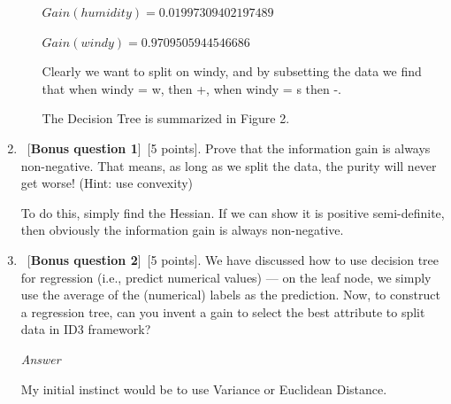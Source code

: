 \documentclass[12pt, fullpage,letterpaper]{article}
\begin{document}
\begin{enumerate}
\begin{enumerate}
$Gain(humidity)=0.01997309402197489$

$Gain(windy)=0.9709505944546686$

Clearly we want to split on windy, and by subsetting the data we find that when windy = w, then +, when windy = s then -.

The Decision Tree is summarized in Figure 2.

\end{enumerate}
\item ~[\textbf{Bonus question 1}]~[5 points].  Prove that the information gain is always non-negative.  That means, as long as we split the data, the purity will never get worse! (Hint: use convexity)

To do this, simply find the Hessian. If we can show it is positive semi-definite, then obviously the information gain is always non-negative.

\item ~[\textbf{Bonus question 2}]~[5 points].  We have discussed how to use decision tree for regression (i.e., predict numerical values) --- on the leaf node, we simply use the average of the (numerical) labels as the prediction.  Now, to construct a regression tree, can you invent a gain to select the best attribute to split data in ID3 framework?

\emph{Answer}

My initial instinct would be to use Variance or Euclidean Distance.

\end{enumerate}
\end{document}
